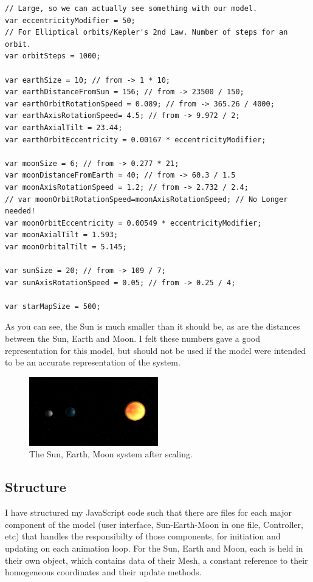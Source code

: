 \documentclass[12pt]{article}
\begin{document}
\begin{lstlisting}
// Large, so we can actually see something with our model.
var eccentricityModifier = 50; 
// For Elliptical orbits/Kepler's 2nd Law. Number of steps for an orbit.
var orbitSteps = 1000;

var earthSize = 10; // from -> 1 * 10; 
var earthDistanceFromSun = 156; // from -> 23500 / 150; 
var earthOrbitRotationSpeed = 0.089; // from -> 365.26 / 4000; 
var earthAxisRotationSpeed= 4.5; // from -> 9.972 / 2; 
var earthAxialTilt = 23.44;
var earthOrbitEccentricity = 0.00167 * eccentricityModifier;

var moonSize = 6; // from -> 0.277 * 21;
var moonDistanceFromEarth = 40; // from -> 60.3 / 1.5
var moonAxisRotationSpeed = 1.2; // from -> 2.732 / 2.4;
// var moonOrbitRotationSpeed=moonAxisRotationSpeed; // No Longer needed!
var moonOrbitEccentricity = 0.00549 * eccentricityModifier;
var moonAxialTilt = 1.593;
var moonOrbitalTilt = 5.145;

var sunSize = 20; // from -> 109 / 7;
var sunAxisRotationSpeed = 0.05; // from -> 0.25 / 4;

var starMapSize = 500;
\end{lstlisting}

As you can see, the Sun is much smaller than it should be, as are the distances between the Sun, Earth and Moon. I felt these numbers gave a good representation for this model, but should not be used if the model were intended to be an accurate representation of the system.

\begin{figure}[H]
        \centering
       
                \includegraphics[width=0.5\textwidth]{images/scales}
                \caption{ The Sun, Earth, Moon system after scaling.}
                \label{fig: The Sun, Earth, Moon system after scaling.}
      
\end{figure}

\subsection{Structure}
I have structured my JavaScript code such that there are files for each major component of the model (user interface, Sun-Earth-Moon in one file, Controller, etc) that handles the responsibilty of those components, for initiation and updating on each animation loop. For the Sun, Earth and Moon, each is held in their own object, which contains data of their Mesh, a constant reference to their homogeneous coordinates and their update methods.
\end{document}
